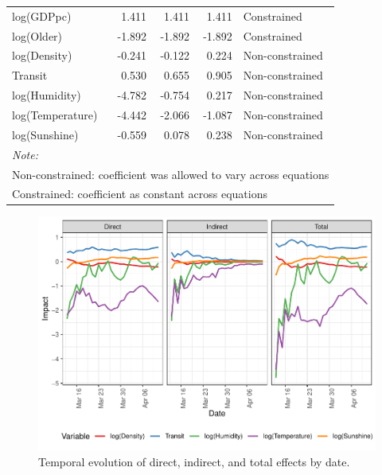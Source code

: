 \documentclass[]{elsarticle} %
\makeatletter
\def\maxwidth{\ifdim\Gin@nat@width>\linewidth\linewidth
\else\Gin@nat@width\fi}
\let\Oldincludegraphics\includegraphics
\renewcommand{\includegraphics}[1]{\Oldincludegraphics[width=\maxwidth]{#1}}
\makeatother
\begin{document}
\begin{table}
\begin{tabular}[t]{lrrrl}
\hspace{1em}log(GDPpc) & 1.411 & 1.411 & 1.411 & Constrained\\
\hspace{1em}log(Older) & -1.892 & -1.892 & -1.892 & Constrained\\
\rowcolor{gray!6}  \hspace{1em}log(Density) & -0.241 & -0.122 & 0.224 & Non-constrained\\
\hspace{1em}Transit & 0.530 & 0.655 & 0.905 & Non-constrained\\
\rowcolor{gray!6}  \hspace{1em}log(Humidity) & -4.782 & -0.754 & 0.217 & Non-constrained\\
\hspace{1em}log(Temperature) & -4.442 & -2.066 & -1.087 & Non-constrained\\
\rowcolor{gray!6}  \hspace{1em}log(Sunshine) & -0.559 & 0.078 & 0.238 & Non-constrained\\
\bottomrule
\multicolumn{5}{l}{\textit{Note: }}\\
\multicolumn{5}{l}{Non-constrained: coefficient was allowed to vary across equations}\\
\multicolumn{5}{l}{Constrained: coefficient as constant across equations}\\
\end{tabular}
\end{table}

\begin{figure}
\centering
\includegraphics{Environmental-Correlates-of-COVID19-Spain_files/figure-latex/plot-impacts-1.pdf}
\caption{\label{fig:plot-impacts}Temporal evolution of direct, indirect,
and total effects by date.}
\end{figure}
\end{document}
